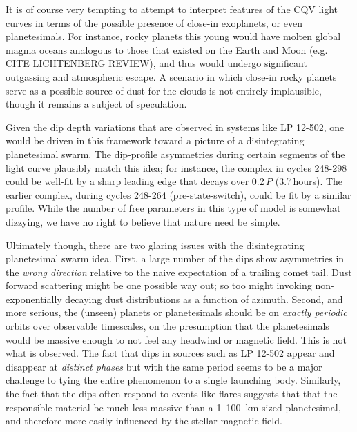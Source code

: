 \documentclass[11pt,twocolumn,tighten]{aastex63}
\begin{document}
It is of course very tempting to attempt to interpret features of the
CQV light curves in terms of the possible presence of close-in
exoplanets, or even planetesimals.  For instance, rocky planets this
young would have molten global magma oceans analogous to those that
existed on the Earth and Moon (e.g. CITE LICHTENBERG REVIEW), and thus
would undergo significant outgassing and atmospheric escape.  A
scenario in which close-in rocky planets serve as a possible source of
dust for the clouds is not entirely implausible, though it remains a
subject of speculation.

Given the dip depth variations that are observed in systems like LP
12-502, one would be driven in this framework toward a picture of a
disintegrating planetesimal swarm.  The dip-profile asymmetries during
certain segments of the light curve plausibly match this idea; for
instance, the complex in cycles 248-298 could be well-fit by a sharp
leading edge that decays over 0.2\,$P$ (3.7\,hours).  The earlier
complex, during cycles 248-264 (pre-state-switch), could be fit by a
similar profile.  While the number of free parameters in this type of
model is somewhat dizzying, we have no right to believe that nature
need be simple.




Ultimately though, there are two glaring issues with the
disintegrating planetesimal swarm idea.  First, a large number of the
dips show asymmetries in the {\it wrong direction} relative to the
naive expectation of a trailing comet tail.  Dust forward scattering
might be one possible way out; so too might invoking non-exponentially
decaying dust distributions as a function of azimuth.  Second, and
more serious, the (unseen) planets or planetesimals should be on {\it
exactly periodic} orbits over observable timescales, on the
presumption that the planetesimals would be massive enough to not feel
any headwind or magnetic field.  This is not what is observed.  The
fact that dips in sources such as LP 12-502 appear and disappear at
{\it distinct phases} but with the same period seems to be a major
challenge to tying the entire phenomenon to a single launching body.
Similarly, the fact that the dips often respond to events like flares
suggests that that the responsible material be much less massive than
a 1--100-\,km sized planetesimal, and therefore more easily influenced
by the stellar magnetic field.
\end{document}
